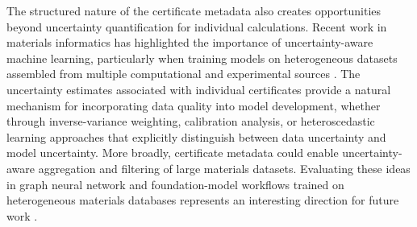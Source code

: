 \documentclass[prb,twocolumn,superscriptaddress,amsmath,amssymb,longbibliography]{revtex4-2}
\begin{document}
The structured nature of the certificate metadata also creates opportunities beyond uncertainty quantification for individual calculations. Recent work in materials informatics has highlighted the importance of uncertainty-aware machine learning, particularly when training models on heterogeneous datasets assembled from multiple computational and experimental sources \cite{Kendall2017,Nix1994,Guo2017_calibration,Kuleshov2018,Tran2018_active}. The uncertainty estimates associated with individual certificates provide a natural mechanism for incorporating data quality into model development, whether through inverse-variance weighting, calibration analysis, or heteroscedastic learning approaches that explicitly distinguish between data uncertainty and model uncertainty. More broadly, certificate metadata could enable uncertainty-aware aggregation and filtering of large materials datasets. Evaluating these ideas in graph neural network and foundation-model workflows trained on heterogeneous materials databases represents an interesting direction for future work \cite{Schutt2018_SchNet,Chen2022_M3GNet,Batatia2022_MACE}.

\end{document}

